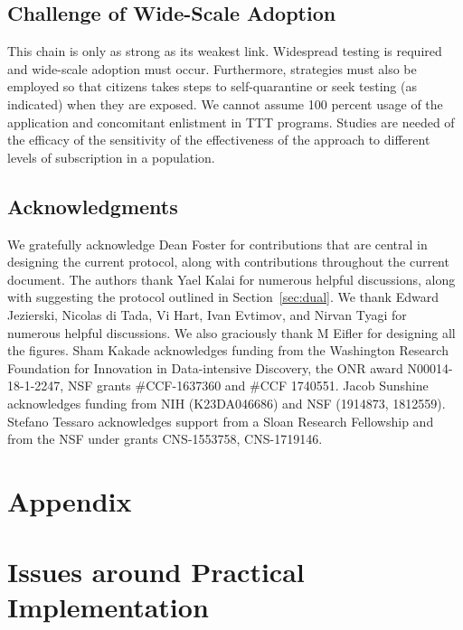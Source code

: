 \documentclass{article}
\begin{document}
\subsection{Challenge of Wide-Scale Adoption}
This chain is only as strong as its weakest link.  Widespread testing is required and wide-scale adoption must occur. Furthermore, strategies must also be employed so that citizens takes steps to self-quarantine or seek testing (as indicated) when they are exposed. We cannot assume 100 percent usage of the application and concomitant enlistment in TTT programs.  Studies are needed of the efficacy of the sensitivity of the effectiveness of the approach to different levels of subscription in a population.


\subsection*{Acknowledgments}
We gratefully acknowledge Dean Foster for contributions that are central in designing the current protocol, along with contributions throughout the current document.
The authors thank Yael Kalai for numerous helpful discussions, along with suggesting the protocol outlined in Section~\ref{sec:dual}. 
We thank Edward Jezierski, Nicolas di Tada, Vi Hart, Ivan Evtimov, and Nirvan Tyagi for numerous helpful discussions. We also graciously thank M Eifler for designing all the figures.
Sham Kakade acknowledges funding from the Washington Research
Foundation for Innovation in Data-intensive Discovery, the ONR award
N00014-18-1-2247, NSF grants \#CCF-1637360 and \#CCF 1740551. Jacob Sunshine acknowledges
funding from NIH (K23DA046686) and NSF (1914873, 1812559). Stefano Tessaro acknowledges support from a Sloan Research Fellowship and from the NSF under grants CNS-1553758, CNS-1719146.






\newpage
\appendix

\section*{Appendix}

\section{Issues around Practical Implementation}
\end{document}
